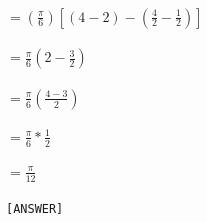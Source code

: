 \documentclass{article}
\newcommand\tab[1][1cm]{\hspace*{#1}}
\begin{document}
\begin{homeworkProblem}
\\ $ =\left(\frac{\pi}{6}\right) \left[\left(4-2\right) - \left(\frac{4}{2} - \frac{1}{2}\right)\right] $  \\
\\$= \frac{\pi}{6}(2-\frac{3}{2})$\\
\\$= \frac{\pi}{6} \left(\frac{4-3}{2}\right)$\\
\\$= \frac{\pi}{6}* \frac{1}{2}$\\
\\$= \frac{\pi}{12}$  \\
\vspace{3mm}\\
\tab\tab\tab\texttt{[ANSWER]}
\end{homeworkProblem}
\pagebreak


                
\end{document}
